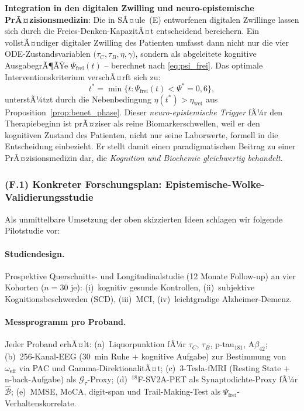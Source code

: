 ﻿\documentclass[12pt,a4paper]{article}
\theoremstyle{definition}
\begin{document}
	\textbf{Integration in den digitalen Zwilling und neuro-epistemische PrÃ¤zisionsmedizin}:
	Die in SÃ¤ule~(E) entworfenen digitalen Zwillinge lassen sich durch die Freies-Denken-KapazitÃ¤t entscheidend bereichern. Ein vollstÃ¤ndiger digitaler Zwilling des Patienten umfasst dann nicht nur die vier ODE-Zustandsvariablen $\bigl(\tau_C, \tau_B, \eta, \gamma\bigr)$, sondern als abgeleitete kognitive AusgabegrÃ¶ÃŸe $\Psi_{\mathrm{frei}}(t)$ -- berechnet nach \cref{eq:psi_frei}. Das optimale Interventionskriterium verschÃ¤rft sich zu:
	\[
		t^* = \min\bigl\{t : \Psi_{\mathrm{frei}}(t) < \Psi^* = 0{,}6\bigr\},
	\]
	unterstÃ¼tzt durch die Nebenbedingung $\eta(t^*) > \eta_{\mathrm{wet}}$ aus Proposition~\ref{prop:benet_phase}. Dieser \emph{neuro-epistemische Trigger} fÃ¼r den Therapiebeginn ist prÃ¤ziser als reine Biomarkerschwellen, weil er den kognitiven Zustand des Patienten, nicht nur seine Laborwerte, formell in die Entscheidung einbezieht. Er stellt damit einen paradigmatischen Beitrag zu einer PrÃ¤zisionsmedizin dar, die \emph{Kognition und Biochemie gleichwertig behandelt}.

	\subsubsection*{(F.1) Konkreter Forschungsplan: Epistemische-Wolke-Validierungsstudie}

	Als unmittelbare Umsetzung der oben skizzierten Ideen schlagen wir folgende Pilotstudie vor:
	\paragraph{Studiendesign.}
	Prospektive Querschnitts- und Longitudinalstudie (12 Monate Follow-up) an vier Kohorten ($n=30$ je): (i)~kognitiv gesunde Kontrollen, (ii)~subjektive Kognitionsbeschwerden (SCD), (iii)~MCI, (iv)~leichtgradige Alzheimer-Demenz.
	\paragraph{Messprogramm pro Proband.}
	Jeder Proband erhÃ¤lt: (a)~Liquorpunktion fÃ¼r $\tau_C$, $\tau_B$, p-tau$_{181}$, A$\beta_{42}$; (b)~256-Kanal-EEG (30~min Ruhe + kognitive Aufgabe) zur Bestimmung von $\omega_{\mathrm{eff}}$ via PAC und Gamma-DirektionalitÃ¤t; (c)~3-Tesla-fMRI (Resting State + n-back-Aufgabe) als $\mathcal{G}_\tau$-Proxy; (d)~${}^{18}$F-SV2A-PET als Synaptodichte-Proxy fÃ¼r $\hat{\mathcal{B}}$; (e)~MMSE, MoCA, digit-span und Trail-Making-Test als $\Psi_{\mathrm{frei}}$-Verhaltenskorrelate.
\end{document}
